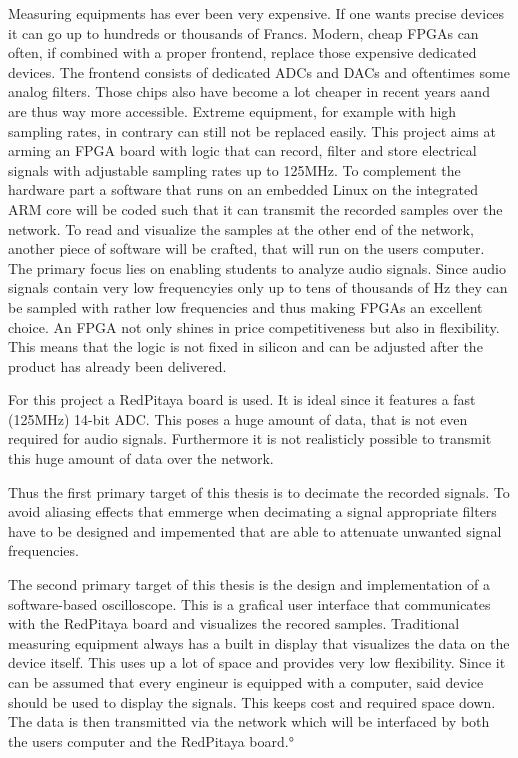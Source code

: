 Measuring equipments has ever been very expensive. If one wants precise devices it can go up to hundreds or thousands of Francs. Modern, cheap FPGAs can often, if combined with a proper frontend, replace those expensive dedicated devices.
The frontend consists of dedicated ADCs and DACs and oftentimes some analog filters. Those chips also have become a lot cheaper in recent years aand are thus way more accessible.
Extreme equipment, for example with high sampling rates, in contrary can still not be replaced easily.
This project aims at arming an FPGA board with logic that can record, filter and store electrical signals with adjustable sampling rates up to 125\si{\mega\hertz}. To complement the hardware part a software that runs on an embedded Linux on the integrated ARM core will be coded such that it can transmit the recorded samples over the network.
To read and visualize the samples at the other end of the network, another piece of software will be crafted, that will run on the users computer.
The primary focus lies on enabling students to analyze audio signals. Since audio signals contain very low frequencyies only up to tens of thousands of \si{\hertz} they can be sampled with rather low frequencies and thus making FPGAs an excellent choice.
An FPGA not only shines in price competitiveness but also in flexibility.
This means that the logic is not fixed in silicon and can be adjusted after the product has already been delivered.

For this project a RedPitaya board is used. It is ideal since it features a fast (125\si{\mega\hertz}) 14-bit ADC. This poses a huge amount of data, that is not even required for audio signals. Furthermore it is not realisticly possible to transmit this huge amount of data over the network.

Thus the first primary target of this thesis is to decimate the recorded signals. To avoid aliasing effects that emmerge when decimating a signal appropriate filters have to be designed and impemented that are able to attenuate unwanted signal frequencies.

The second primary target of this thesis is the design and implementation of a software-based oscilloscope. This is a grafical user interface that communicates with the RedPitaya board and visualizes the recored samples.
Traditional measuring equipment always has a built in display that visualizes the data on the device itself. This uses up a lot of space and provides very low flexibility.
Since it can be assumed that every engineur is equipped with a computer, said device should be used to display the signals. This keeps cost and required space down.
The data is then transmitted via the network which will be interfaced by both the users computer and the RedPitaya board.°